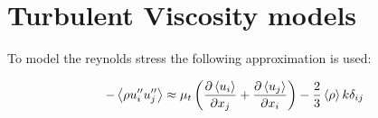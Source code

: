 \section{Turbulent Viscosity models}

To model the reynolds stress the following approximation is used:

\begin{equation}
-\left<{ \rho u''_i u''_j}\right> \approx \mu_t\left(\frac{\partial \left<{u_i}\right>}{\partial {x_j}}+\frac{\partial \left<{u_j}\right>}{\partial {x_i}}\right) - \frac{2}{3}\left<{\rho}\right>k\delta_{ij}
\end{equation}